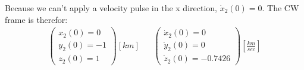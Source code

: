 \documentclass[11pt, a4paper]{article}
\begin{document}
Because we can't apply a velocity pulse in the x direction, $\dot{x}_2(0) = 0$. The CW frame is therefor:
\begin{equation}
    \begin{matrix}
    \begin{pmatrix}
        x_2(0)=0 \\ y_2(0)=-1 \\ z_2(0)=1
    \end{pmatrix}\left[km\right] &&
    \begin{pmatrix}
        \dot{x}_2(0)=0 \\ \dot{y}_2(0) =0 \\ \dot{z}_2(0)=-0.7426
    \end{pmatrix}\left[\displaystyle\frac{km}{sec}\right]
    \end{matrix}
\end{equation}

\end{document}
